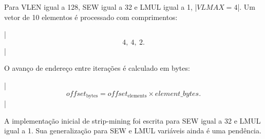 Para VLEN igual a 128, SEW igual a 32 e LMUL igual a 1,
|$VLMAX=4$|. Um vetor de 10 elementos é processado com comprimentos:

|$$
4,\ 4,\ 2.
$$|

O avanço de endereço entre iterações é calculado em bytes:

|$$
offset_{\text{bytes}} =
offset_{\text{elements}} \times element\_bytes.
$$|

A implementação inicial de strip-mining foi escrita para SEW igual a
32 e LMUL igual a 1. Sua generalização para SEW e LMUL variáveis ainda
é uma pendência.